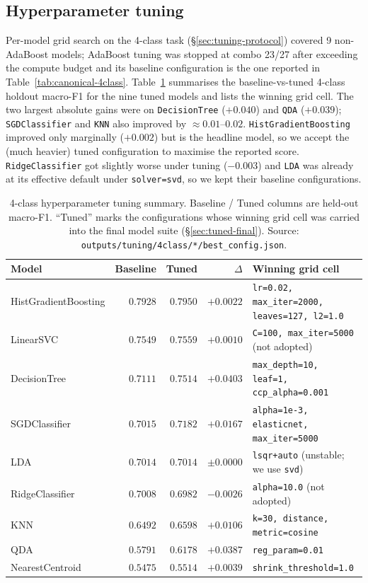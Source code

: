 \documentclass[11pt,a4paper]{article}
\begin{document}
\subsection{Hyperparameter tuning}
\label{sec:tuning-results}

Per-model grid search on the 4-class task (\S\ref{sec:tuning-protocol})
covered 9 non-AdaBoost models; AdaBoost tuning was stopped at combo 23/27
after exceeding the compute budget and its baseline configuration is the
one reported in Table~\ref{tab:canonical-4class}. Table~\ref{tab:tuning}
summarises the baseline-vs-tuned 4-class holdout macro-F1 for the nine
tuned models and lists the winning grid cell. The two largest absolute
gains were on \texttt{DecisionTree} ($+0.040$) and \texttt{QDA} ($+0.039$);
\texttt{SGDClassifier} and \texttt{KNN} also improved by $\approx 0.01$--$0.02$.
\texttt{HistGradientBoosting} improved only marginally ($+0.002$) but is the
headline model, so we accept the (much heavier) tuned configuration to
maximise the reported score. \texttt{RidgeClassifier} got slightly worse
under tuning ($-0.003$) and \texttt{LDA} was already at its effective default
under \texttt{solver=svd}, so we kept their baseline configurations.

\begin{table}[H]
\centering
\caption{4-class hyperparameter tuning summary. Baseline / Tuned columns are
held-out macro-F1. ``Tuned'' marks the configurations whose winning grid cell
was carried into the final model suite (\S\ref{sec:tuned-final}). Source:
\texttt{outputs/tuning/4class/*/best\_config.json}.}
\label{tab:tuning}
\small
\begin{tabular}{lrrrl}
\toprule
Model & Baseline & Tuned & $\Delta$ & Winning grid cell \\
\midrule
HistGradientBoosting & $0.7928$ & $0.7950$ & $+0.0022$ & \texttt{lr=0.02, max\_iter=2000, leaves=127, l2=1.0} \\
LinearSVC            & $0.7549$ & $0.7559$ & $+0.0010$ & \texttt{C=100, max\_iter=5000} (not adopted) \\
DecisionTree         & $0.7111$ & $0.7514$ & $+0.0403$ & \texttt{max\_depth=10, leaf=1, ccp\_alpha=0.001} \\
SGDClassifier        & $0.7015$ & $0.7182$ & $+0.0167$ & \texttt{alpha=1e-3, elasticnet, max\_iter=5000} \\
LDA                  & $0.7014$ & $0.7014$ & $\pm 0.0000$ & \texttt{lsqr+auto} (unstable; we use \texttt{svd}) \\
RidgeClassifier      & $0.7008$ & $0.6982$ & $-0.0026$ & \texttt{alpha=10.0} (not adopted) \\
KNN                  & $0.6492$ & $0.6598$ & $+0.0106$ & \texttt{k=30, distance, metric=cosine} \\
QDA                  & $0.5791$ & $0.6178$ & $+0.0387$ & \texttt{reg\_param=0.01} \\
NearestCentroid      & $0.5475$ & $0.5514$ & $+0.0039$ & \texttt{shrink\_threshold=1.0} \\
\bottomrule
\end{tabular}
\end{table}
\end{document}
